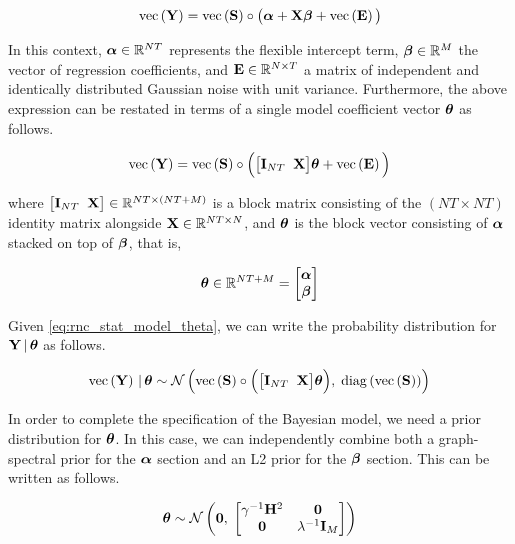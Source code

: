 \begin{equation}
    \text{\textup{vec}}\left(\mathbf{Y}\right) = \text{\textup{vec}}\left(\mathbf{S}\right) \circ \big( \boldsymbol{\alpha} + \mathbf{X} \boldsymbol{\beta}  + \text{\textup{vec}}\left(\mathbf{E}\right) \big)
\end{equation}

In this context, $\boldsymbol{\alpha} \in \mathbb{R}^{NT}$ represents the flexible intercept term, $\boldsymbol{\beta} \in \mathbb{R}^{M}$ the vector of regression coefficients, and $\mathbf{E} \in \mathbb{R}^{N \times T}$ a matrix of independent and identically distributed Gaussian noise with unit variance. Furthermore, the above expression can be restated in terms of a single model coefficient vector $\boldsymbol{\theta}$ as follows.

\begin{equation}
    \label{eq:rnc_stat_model_theta}
    \text{\textup{vec}}\left(\mathbf{Y}\right) = \text{\textup{vec}}\left(\mathbf{S}\right) \circ \Big( \big[ \mathbf{I}_{NT} \;\; \mathbf{X} \big]\boldsymbol{\theta}  + \text{\textup{vec}}\left(\mathbf{E}\right) \Big)
\end{equation}

where $\big[ \mathbf{I}_{NT} \;\; \mathbf{X} \big] \in \mathbb{R}^{NT \times (NT + M)}$ is a block matrix consisting of the $(NT \times NT)$ identity matrix alongside $\mathbf{X} \in \mathbb{R}^{NT \times N}$, and $\boldsymbol{\theta}$ is the block vector consisting of $\boldsymbol{\alpha}$ stacked on top of $\boldsymbol{\beta}$, that is, 

\begin{equation}
    \boldsymbol{\theta} \in \mathbb{R}^{NT + M} = \begin{bmatrix} \boldsymbol{\alpha} \\ \boldsymbol{\beta} \end{bmatrix}
\end{equation}

Given \cref{eq:rnc_stat_model_theta}, we can write the probability distribution for $\mathbf{Y} \, | \, \boldsymbol{\theta}$ as follows.  

\begin{equation}
    \text{\textup{vec}}\left(\mathbf{Y}\right) \, | \, \boldsymbol{\theta} \sim \mathcal{N}\left(\text{\textup{vec}}\left(\mathbf{S}\right) \circ \Big( \big[ \mathbf{I}_{NT} \;\; \mathbf{X} \big]\boldsymbol{\theta} \Big), \; \text{\textup{diag}}\left(\text{\textup{vec}}\left(\mathbf{S}\right)\right)\right)
\end{equation}

In order to complete the specification of the Bayesian model, we need a prior distribution for $\boldsymbol{\theta}$. In this case, we can independently combine both a graph-spectral prior for the $\boldsymbol{\alpha}$ section and an L2 prior for the $\boldsymbol{\beta}$ section. This can be written as follows. 

\begin{equation}
    \boldsymbol{\theta} \sim \mathcal{N}\left( \mathbf{0}, \; \begin{bmatrix} \gamma^{-1} \mathbf{H}^2 & \mathbf{0} \\ \mathbf{0} & \lambda^{-1} \mathbf{I}_M \end{bmatrix} \right)
\end{equation}

